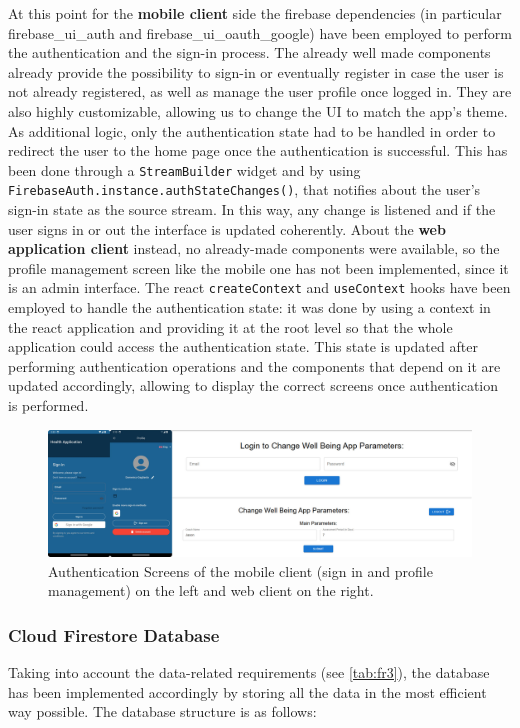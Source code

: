 \noindent At this point for the \textbf{mobile client} side the firebase dependencies (in particular firebase\_ui\_auth and firebase\_ui\_oauth\_google) have been employed to perform the authentication and the sign-in process. The already well made components already provide the possibility to sign-in or eventually register in case the user is not already registered, as well as manage the user profile once logged in. They are also highly customizable, allowing us to change the UI to match the app's theme. As additional logic, only the authentication state had to be handled in order to redirect the user to the home page once the authentication is successful. This has been done through a \texttt{StreamBuilder} widget and by using \texttt{FirebaseAuth.instance.authStateChanges()}, that notifies about the user's sign-in state as the source stream. In this way, any change is listened and if the user signs in or out the interface is updated coherently.
\newpage
\noindent About the \textbf{web application client} instead, no already-made components were available, so the profile management screen like the mobile one has not been implemented, since it is an admin interface. The react \texttt{createContext} and \texttt{useContext} hooks have been employed to handle the authentication state: it was done by using a context in the react application and providing it at the root level so that the whole application could access the authentication state. This state is updated after performing authentication operations and the components that depend on it are updated accordingly, allowing to display the correct screens once authentication is performed.   

\begin{figure}
    \includegraphics[width=1.0\linewidth]{./images/authenticationScreens.jpg}
    \caption{Authentication Screens of the mobile client (sign in and profile management) on the left and web client on the right.}
\end{figure}

\subsubsection{Cloud Firestore Database}
Taking into account the data-related requirements (see \cref{tab:fr3}), the database has been implemented accordingly by storing all the data in the most efficient way possible. \newline The database structure is as follows:

